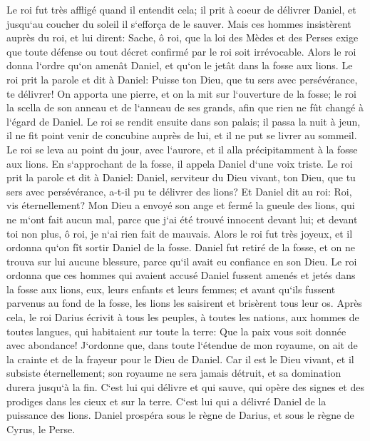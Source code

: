 \verse Le roi fut très affligé quand il entendit cela; il prit à coeur de délivrer Daniel, et jusqu`au coucher du soleil il s`efforça de le sauver. 
\verse Mais ces hommes insistèrent auprès du roi, et lui dirent: Sache, ô roi, que la loi des Mèdes et des Perses exige que toute défense ou tout décret confirmé par le roi soit irrévocable. 
\verse Alors le roi donna l`ordre qu`on amenât Daniel, et qu`on le jetât dans la fosse aux lions. Le roi prit la parole et dit à Daniel: Puisse ton Dieu, que tu sers avec persévérance, te délivrer! 
\verse On apporta une pierre, et on la mit sur l`ouverture de la fosse; le roi la scella de son anneau et de l`anneau de ses grands, afin que rien ne fût changé à l`égard de Daniel. 
\verse Le roi se rendit ensuite dans son palais; il passa la nuit à jeun, il ne fit point venir de concubine auprès de lui, et il ne put se livrer au sommeil. 
\verse Le roi se leva au point du jour, avec l`aurore, et il alla précipitamment à la fosse aux lions. 
\verse En s`approchant de la fosse, il appela Daniel d`une voix triste. Le roi prit la parole et dit à Daniel: Daniel, serviteur du Dieu vivant, ton Dieu, que tu sers avec persévérance, a-t-il pu te délivrer des lions? 
\verse Et Daniel dit au roi: Roi, vis éternellement? 
\verse Mon Dieu a envoyé son ange et fermé la gueule des lions, qui ne m`ont fait aucun mal, parce que j`ai été trouvé innocent devant lui; et devant toi non plus, ô roi, je n`ai rien fait de mauvais. 
\verse Alors le roi fut très joyeux, et il ordonna qu`on fît sortir Daniel de la fosse. Daniel fut retiré de la fosse, et on ne trouva sur lui aucune blessure, parce qu`il avait eu confiance en son Dieu. 
\verse Le roi ordonna que ces hommes qui avaient accusé Daniel fussent amenés et jetés dans la fosse aux lions, eux, leurs enfants et leurs femmes; et avant qu`ils fussent parvenus au fond de la fosse, les lions les saisirent et brisèrent tous leur os. 
\verse Après cela, le roi Darius écrivit à tous les peuples, à toutes les nations, aux hommes de toutes langues, qui habitaient sur toute la terre: Que la paix vous soit donnée avec abondance! 
\verse J`ordonne que, dans toute l`étendue de mon royaume, on ait de la crainte et de la frayeur pour le Dieu de Daniel. Car il est le Dieu vivant, et il subsiste éternellement; son royaume ne sera jamais détruit, et sa domination durera jusqu`à la fin. 
\verse C`est lui qui délivre et qui sauve, qui opère des signes et des prodiges dans les cieux et sur la terre. C`est lui qui a délivré Daniel de la puissance des lions. 
\verse Daniel prospéra sous le règne de Darius, et sous le règne de Cyrus, le Perse. 

